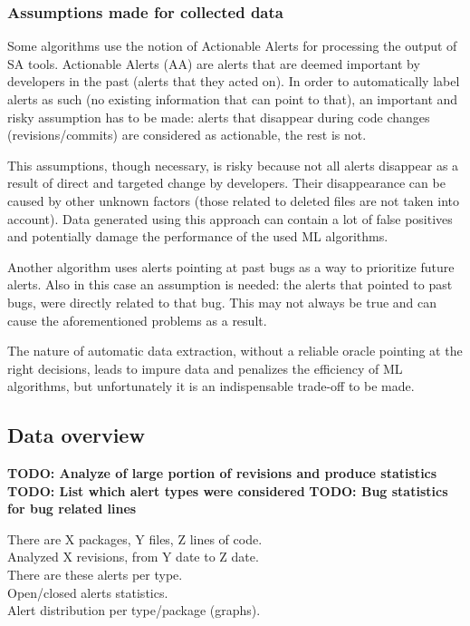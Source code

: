 \documentclass{article}
\begin{document}
\subsubsection{Assumptions made for collected data}
Some algorithms use the notion of Actionable Alerts for processing the output of SA tools. Actionable Alerts (AA) are alerts that are deemed important by developers in the past (alerts that they acted on). In order to automatically label alerts as such (no existing information that can point to that), an important and risky assumption has to be made: alerts that disappear during code changes (revisions/commits) are considered as actionable, the rest is not. 

This assumptions, though necessary, is risky because not all alerts disappear as a result of direct and targeted change by developers. Their disappearance can be caused by other unknown factors (those related to deleted files are not taken into account). Data generated using this approach can contain a lot of false positives and potentially damage the performance of the used ML algorithms.

Another algorithm uses alerts pointing at past bugs as a way to prioritize future alerts. Also in this case an assumption is needed: the alerts that pointed to past bugs, were directly related to that bug. This may not always be true and can cause the aforementioned problems as a result.

The nature of automatic data extraction, without a reliable oracle pointing at the right decisions, leads to impure data and penalizes the efficiency of ML algorithms, but unfortunately it is an indispensable trade-off to be made.

\subsection{Data overview}

\textbf{TODO: Analyze of large portion of revisions and produce statistics}
\textbf{TODO: List which alert types were considered}
\textbf{TODO: Bug statistics for bug related lines}

There are X packages, Y files, Z lines of code.\\
Analyzed X revisions, from Y date to Z date.\\
There are these alerts per type.\\
Open/closed alerts statistics.\\
Alert distribution per type/package (graphs).\\
\end{document}
